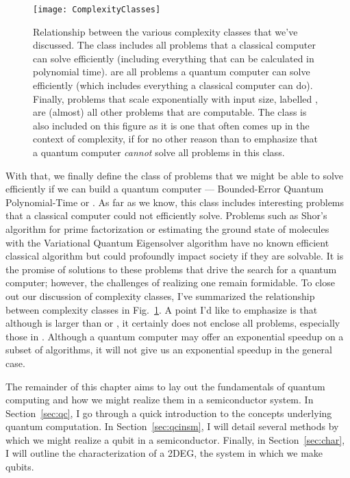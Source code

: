 \begin{figure}
  \texttt{[image: ComplexityClasses]}
  \caption[Relationship between various complexity classes]
  {Relationship between the various complexity classes that we've discussed. The class
   includes all problems that a classical computer can solve efficiently (including
  everything that can be calculated in polynomial time).  are all problems a quantum computer can
  solve efficiently (which includes everything a classical computer can do). Finally, problems that scale exponentially
  with input size, labelled , are (almost) all other problems that are computable. The class
   is also included on this figure as it is one that often comes up in the context of complexity,
  if for no other reason than to emphasize that a quantum computer \emph{cannot} solve all problems in
  this class.}
  \label{fig:complexity}
\end{figure}

With that, we finally define the class of problems that we might be able to solve efficiently if we
can build a quantum computer --- Bounded-Error Quantum Polynomial-Time or . As far as we know,
this class includes interesting problems that a classical computer could not efficiently solve. Problems
such as Shor's algorithm for prime factorization \cite{Shor} or estimating the ground state of molecules with
the Variational Quantum Eigensolver algorithm \cite{ncomms5213} have no known efficient classical algorithm
but could profoundly impact society if they are solvable. It is the promise of solutions to these problems
that drive the search for a quantum computer; however, the challenges of realizing one remain formidable. To close
out our discussion of complexity classes, I've summarized the relationship between complexity classes in
Fig.~\ref{fig:complexity}. A point I'd like to emphasize is that although  is larger than 
or , it certainly does not enclose all problems, especially those in . Although a
quantum computer may offer an exponential speedup on a subset of algorithms, it will not give us an exponential
speedup in the general case.

The remainder of this chapter aims to lay out the fundamentals of quantum computing and how we might realize
them in a semiconductor system. In Section~\ref{sec:qc}, I go through a quick introduction to the concepts
underlying quantum computation. In Section~\ref{sec:qcinsm}, I will detail several methods by which we might
realize a qubit in a semiconductor. Finally, in Section~\ref{sec:char}, I will outline the characterization of a 2DEG,
the system in which we make qubits.


